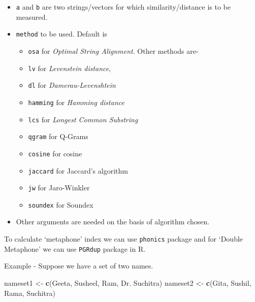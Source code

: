 \documentclass[
]{book}
\newenvironment{Shaded}{\begin{snugshade}}{\end{snugshade}}
\newcommand{\FunctionTok}[1]{\textcolor[rgb]{0.13,0.29,0.53}{\textbf{#1}}}
\newcommand{\NormalTok}[1]{#1}
\newcommand{\OtherTok}[1]{\textcolor[rgb]{0.56,0.35,0.01}{#1}}
\newcommand{\StringTok}[1]{\textcolor[rgb]{0.31,0.60,0.02}{#1}}
\providecommand{\tightlist}{%
  \setlength{\itemsep}{0pt}\setlength{\parskip}{0pt}}
\begin{document}
\begin{itemize}
\tightlist
\item
  \texttt{a} and \texttt{b} are two strings/vectors for which similarity/distance is to be measured.
\item
  \texttt{method} to be used. Default is

  \begin{itemize}
  \tightlist
  \item
    \texttt{osa} for \emph{Optimal String Alignment}. Other methods are-
  \item
    \texttt{lv} for \emph{Levenstein distance},
  \item
    \texttt{dl} for \emph{Damerau-Levenshtein}
  \item
    \texttt{hamming} for \emph{Hamming distance}
  \item
    \texttt{lcs} for \emph{Longest Common Substring}
  \item
    \texttt{qgram} for Q-Grams
  \item
    \texttt{cosine} for cosine
  \item
    \texttt{jaccard} for Jaccard's algorithm
  \item
    \texttt{jw} for Jaro-Winkler
  \item
    \texttt{soundex} for Soundex
  \end{itemize}
\item
  Other arguments are needed on the basis of algorithm chosen.
\end{itemize}

To calculate `metaphone' index we can use \texttt{phonics} package and for `Double Metaphone' we can use \texttt{PGRdup} package in R.

Example - Suppose we have a set of two names.

\begin{Shaded}
\begin{Highlighting}[]
\NormalTok{nameset1 }\OtherTok{\textless{}{-}} \FunctionTok{c}\NormalTok{(}\StringTok{\textquotesingle{}Geeta\textquotesingle{}}\NormalTok{, }\StringTok{\textquotesingle{}Susheel\textquotesingle{}}\NormalTok{, }\StringTok{\textquotesingle{}Ram\textquotesingle{}}\NormalTok{, }\StringTok{\textquotesingle{}Dr. Suchitra\textquotesingle{}}\NormalTok{)}
\NormalTok{nameset2 }\OtherTok{\textless{}{-}} \FunctionTok{c}\NormalTok{(}\StringTok{\textquotesingle{}Gita\textquotesingle{}}\NormalTok{, }\StringTok{\textquotesingle{}Sushil\textquotesingle{}}\NormalTok{, }\StringTok{\textquotesingle{}Rama\textquotesingle{}}\NormalTok{, }\StringTok{\textquotesingle{}Suchitra\textquotesingle{}}\NormalTok{)}
\end{Highlighting}
\end{Shaded}
\end{document}
